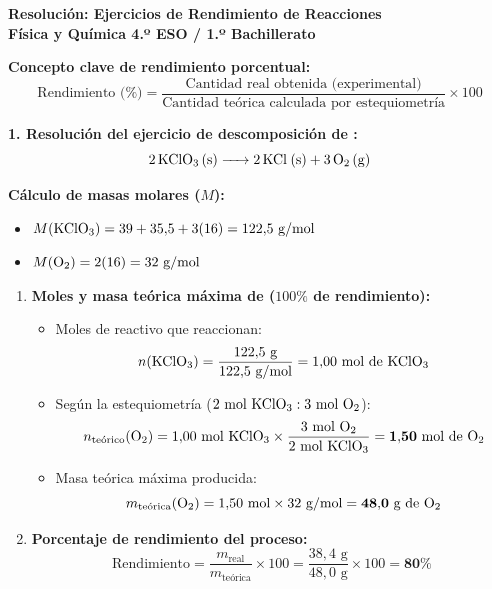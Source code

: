 ﻿\documentclass[11pt,a4paper]{article}
\begin{document}
\pagestyle{empty}

\begin{center}
    {\LARGE \textbf{Resolución: Ejercicios de Rendimiento de Reacciones}}\\[4pt]
    {\large \textbf{Física y Química 4.º ESO / 1.º Bachillerato}}
\end{center}

\vspace{0.3cm}
\noindent\textbf{Concepto clave de rendimiento porcentual:}
\[
\text{Rendimiento (\%)} = \frac{\text{Cantidad real obtenida (experimental)}}{\text{Cantidad teórica calculada por estequiometría}} \times 100
\]

\vspace{0.3cm}
\noindent\textbf{1. Resolución del ejercicio de descomposición de :}
\[
\ce{2 KClO3 (s) -> 2 KCl (s) + 3 O2 (g)}
\]

\noindent\textbf{Cálculo de masas molares ($M$):}
\begin{itemize}[leftmargin=1.5em, itemsep=2pt]
    \item $M(\ce{KClO3}) = 39 + 35{,}5 + 3(16) = 122{,}5\text{ g/mol}$
    \item $M(\ce{O2}) = 2(16) = 32\text{ g/mol}$
\end{itemize}

\begin{enumerate}[label=\textbf{\alph*)}, leftmargin=2em, itemsep=5pt]
    \item \textbf{Moles y masa teórica máxima de  ($100\%$ de rendimiento):}
    \begin{itemize}[leftmargin=1.5em, itemsep=3pt]
        \item Moles de reactivo que reaccionan:
        \[
        n(\ce{KClO3}) = \frac{122{,}5\text{ g}}{122{,}5\text{ g/mol}} = 1{,}00\text{ mol de \ce{KClO3}}
        \]
        \item Según la estequiometría ($2\text{ mol \ce{KClO3}} : 3\text{ mol \ce{O2}}$):
        \[
        n_{\text{teórico}}(\ce{O2}) = 1{,}00\text{ mol \ce{KClO3}} \times \frac{3\text{ mol \ce{O2}}}{2\text{ mol \ce{KClO3}}} = \mathbf{1{,}50\text{ mol de \ce{O2}}}
        \]
        \item Masa teórica máxima producida:
        \[
        m_{\text{teórica}}(\ce{O2}) = 1{,}50\text{ mol} \times 32\text{ g/mol} = \mathbf{48{,}0\text{ g de \ce{O2}}}
        \]
    \end{itemize}

    \item \textbf{Porcentaje de rendimiento del proceso:}
    \[
    \text{Rendimiento} = \frac{m_{\text{real}}}{m_{\text{teórica}}} \times 100 = \frac{38{,}4\text{ g}}{48{,}0\text{ g}} \times 100 = \mathbf{80\%}
    \]
\end{enumerate}
\end{document}
